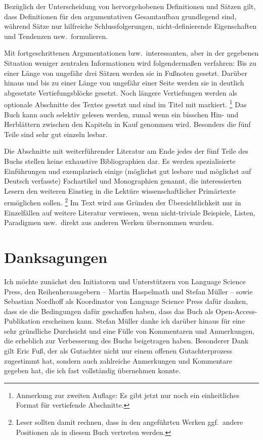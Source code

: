 Bezüglich der Unterscheidung von hervorgehobenen Definitionen und Sätzen gilt, dass Definitionen für den argumentativen Gesamtaufbau grundlegend sind, während Sätze nur hilfreiche Schlussfolgerungen, nicht-definierende Eigenschaften und Tendenzen usw.\ formulieren.

Mit fortgeschrittenen Argumentationen bzw.\ interessanten, aber in der gegebenen Situation weniger zentralen Informationen wird folgendermaßen verfahren:
Bis zu einer Länge von ungefähr drei Sätzen werden sie in Fußnoten gesetzt.
Darüber hinaus und bis zu einer Länge von ungefähr einer Seite werden sie in deutlich abgesetzte Vertiefungsblöcke gesetzt.
Noch längere Vertiefungen werden als optionale Abschnitte des Textes gesetzt und sind im Titel mit \Opsional markiert.%
\footnote{Anmerkung zur zweiten Auflage:
Es gibt jetzt nur noch ein einheitliches Format für vertiefende Abschnitte.}
Das Buch kann auch selektiv gelesen werden, zumal wenn ein bisschen Hin- und Herblättern zwischen den Kapiteln in Kauf genommen wird.
Besonders die fünf Teile sind sehr gut einzeln lesbar.

Die Abschnitte mit weiterführender Literatur am Ende jedes der fünf Teile des Buchs stellen keine exhaustive Bibliographien dar.
Es werden spezialisierte Einführungen und exemplarisch einige (möglichst gut lesbare und möglichst auf Deutsch verfasste) Fachartikel und Monographien genannt, die interessierten Lesern den weiteren Einstieg in die Lektüre wissenschaftlicher Primärtexte ermöglichen sollen.%
\footnote{Leser sollten damit rechnen, dass in den angeführten Werken ggf.\ andere Positionen als in diesem Buch vertreten werden.}
Im Text wird aus Gründen der Übersichtlichkeit nur in Einzelfällen auf weitere Literatur verwiesen, \zB wenn nicht-triviale Beispiele, Listen, Paradigmen usw.\ direkt aus anderen Werken übernommen wurden.

\section*{Danksagungen}

Ich möchte zunächst den Initiatoren und Unterstützern von Language Science Press, den Reihenherausgebern -- Martin Haspelmath und Stefan Müller -- sowie Sebastian Nordhoff als Koordinator von Language Science Press dafür danken, dass sie die Bedingungen dafür geschaffen haben, dass das Buch als Open-Access-Publikation erscheinen kann.
Stefan Müller danke ich darüber hinaus für eine sehr gründliche Durchsicht und eine Fülle von Kommentaren und Anmerkungen, die erheblich zur Verbesserung des Buchs beigetragen haben.
Besonderer Dank gilt Eric Fuß, der als Gutachter nicht nur einem offenen Gutachterprozess zugestimmt hat, sondern auch zahlreiche Anmerkungen und Kommentare gegeben hat, die ich fast vollständig übernehmen konnte.

